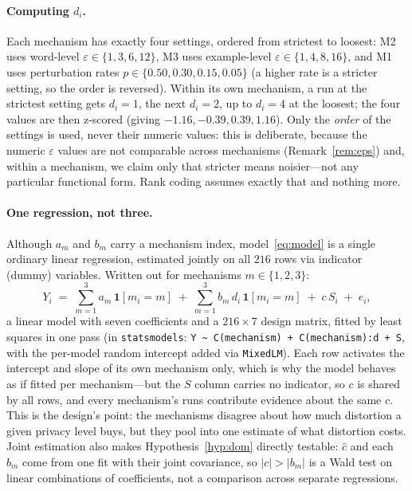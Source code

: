 \documentclass{article}
\theoremstyle{definition}
\theoremstyle{plain}
\theoremstyle{remark}
\newcommand{\eps}{\varepsilon}
\newcommand{\Sdist}{S}
\begin{document}
\paragraph{Computing $d_i$.}
Each mechanism has exactly four settings, ordered from strictest to loosest:
M2 uses word-level $\eps \in \{1, 3, 6, 12\}$, M3 uses example-level
$\eps \in \{1, 4, 8, 16\}$, and M1 uses perturbation rates
$p \in \{0.50, 0.30, 0.15, 0.05\}$ (a higher rate is a stricter setting, so
the order is reversed). Within its own mechanism, a run at the strictest
setting gets $d_i = 1$, the next $d_i = 2$, up to $d_i = 4$ at the loosest;
the four values are then z-scored (giving $-1.16, -0.39, 0.39, 1.16$). Only
the \emph{order} of the settings is used, never their numeric values: this
is deliberate, because the numeric $\eps$ values are not comparable across
mechanisms (Remark~\ref{rem:eps}) and, within a mechanism, we claim only
that stricter means noisier---not any particular functional form. Rank
coding assumes exactly that and nothing more.

\paragraph{One regression, not three.}
Although $a_{m}$ and $b_{m}$ carry a mechanism index, model~\eqref{eq:model}
is a single ordinary linear regression, estimated jointly on all $216$ rows
via indicator (dummy) variables. Written out for mechanisms $m \in \{1,2,3\}$:
\begin{equation}\label{eq:dummies}
  Y_i \;=\; \sum_{m=1}^{3} a_m\,\pmb{1}[m_i{=}m]
        \;+\; \sum_{m=1}^{3} b_m\, d_i\,\pmb{1}[m_i{=}m]
        \;+\; c\, \Sdist_i \;+\; e_i,
\end{equation}
a linear model with seven coefficients and a $216 \times 7$ design matrix,
fitted by least squares in one pass (in \texttt{statsmodels}:
\texttt{Y \textasciitilde{} C(mechanism) + C(mechanism):d + S}, with the
per-model random intercept added via \texttt{MixedLM}). Each row activates
the intercept and slope of its own mechanism only, which is why the model
behaves as if fitted per mechanism---but the $\Sdist$ column carries no
indicator, so $c$ is shared by all rows, and every mechanism's runs
contribute evidence about the same $c$. This is the design's point: the
mechanisms disagree about how much distortion a given privacy level buys,
but they pool into one estimate of what distortion costs. Joint estimation
also makes Hypothesis~\ref{hyp:dom} directly testable: $\hat c$ and each
$\hat b_m$ come from one fit with their joint covariance, so
$|c| > |b_m|$ is a Wald test on linear combinations of coefficients, not a
comparison across separate regressions.
\end{document}

